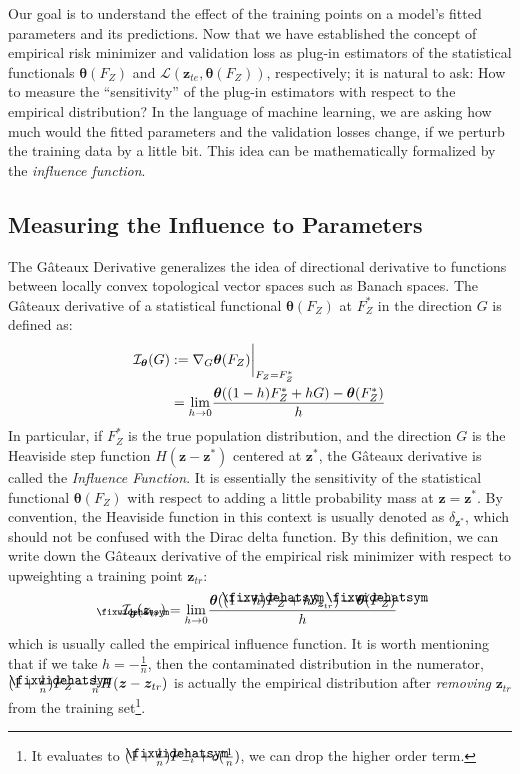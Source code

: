 \documentclass{article}
\newcommand\lowerwidehatsym{%
  \text{\smash{\raisebox{-1.3ex}{%
    $\fixwidehatsym$}}}}
\newcommand\fixwidehat[1]{%
  \mathchoice
    {\accentset{\displaystyle\lowerwidehatsym}{#1}}
    {\accentset{\textstyle\lowerwidehatsym}{#1}}
    {\accentset{\scriptstyle\lowerwidehatsym}{#1}}
    {\accentset{\scriptscriptstyle\lowerwidehatsym}{#1}}
}
\begin{document}
Our goal is to understand the effect of the training points on a model’s fitted parameters and its predictions. Now that we have established the concept of empirical risk minimizer and validation loss as plug-in estimators of the statistical functionals $\bm{\theta}(F_Z)$ and $\mathcal{L}(\bm{z}_{te}, \bm{\theta}(F_Z))$, respectively; it is natural to ask: How to measure the ``sensitivity'' of the plug-in estimators with respect to the empirical distribution? In the language of machine learning, we are asking how much would the fitted parameters and the validation losses change, if we perturb the training data by a little bit. This idea can be mathematically formalized by the \emph{influence function}.



\subsection{Measuring the Influence to Parameters}
The G\^ateaux Derivative generalizes the idea of directional derivative to functions between locally convex topological vector spaces such as Banach spaces. The G\^ateaux derivative of a statistical functional $\bm{\theta}(F_Z)$ at $F^*_Z$ in the direction $G$ is defined as:
\begin{align}\label{gateaux}
	\mathcal{I}_{\bm{\theta}}(G) &:= \nabla_{G} \bm{\theta}(F_Z)\biggr\rvert_{F_Z=F^*_Z} \notag\\
	&= \underset{h \to 0}{\lim}\frac{\bm{\theta}((1-h)F^*_Z + hG) - \bm{\theta}(F^*_Z)}{h}
\end{align}
In particular, if $F^*_Z$ is the true population distribution, and the direction $G$ is the Heaviside step function $H(\bm{z}-\bm{z}^*)$ centered at $\bm{z}^*$, the G\^ateaux derivative is called the \emph{Influence Function}. It is essentially the sensitivity of the statistical functional $\bm{\theta}(F_Z)$ with respect to adding a little probability mass at $\bm{z}=\bm{z}^*$. By convention, the Heaviside function in this context is usually denoted as $\delta_{\bm{z}^*}$, which should not be confused with the Dirac delta function. By this definition, we can write down the G\^ateaux derivative of the empirical risk minimizer with respect to upweighting a training point $\bm{z}_{tr}$: 
\vspace{-6pt}\begin{align}\label{empinfluence}
	\mathcal{I}_{\fixwidehat{\bm{\theta}}}(\bm{z}_{tr}) = \underset{h \to 0}{\lim}\frac{\bm{\theta}((1-h)\fixwidehat{F}_Z+ h\delta_{\bm{z}_{tr}}) - \bm{\theta}(\fixwidehat{F}_Z)}{h}
\end{align}
which is usually called the empirical influence function. It is worth mentioning that if we take $h=-\frac{1}{n}$, then the contaminated distribution in the numerator, $(1+\frac{1}{n})\fixwidehat{F}_Z - \frac{1}{n}H(\bm{z}-\bm{z}_{tr})$ is actually the empirical distribution after \emph{removing} $\bm{z}_{tr}$ from the training set\footnote{It evaluates to $(1+\frac{1}{n})\fixwidehat{F}_{-i} + o(\frac{1}{n})$, we can drop the higher order term.}.
\end{document}
